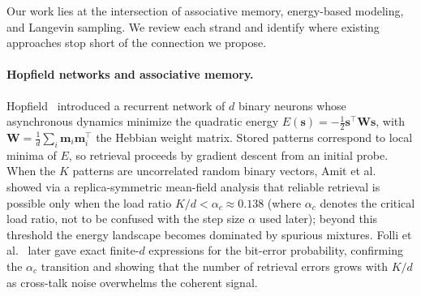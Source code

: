 
Our work lies at the intersection of associative memory, energy-based modeling, and Langevin sampling. We review each strand and identify where existing approaches stop short of the connection we propose.

\paragraph{Hopfield networks and associative memory.}
Hopfield~\cite{hopfieldNeuralNetworksPhysical1982} introduced a recurrent network of $d$ binary neurons whose asynchronous dynamics minimize the quadratic energy $E(\mathbf{s})=-\frac{1}{2}\mathbf{s}^{\top}\mathbf{W}\mathbf{s}$, with $\mathbf{W}=\frac{1}{d}\sum_{i}\mathbf{m}_i\mathbf{m}_i^{\top}$ the Hebbian weight matrix. Stored patterns correspond to local minima of $E$, so retrieval proceeds by gradient descent from an initial probe. When the $K$ patterns are uncorrelated random binary vectors, Amit et al.~\cite{amitStoringInfiniteNumbers1985} showed via a replica-symmetric mean-field analysis that reliable retrieval is possible only when the load ratio $K/d < \alpha_c \approx 0.138$ (where $\alpha_c$ denotes the critical load ratio, not to be confused with the step size $\alpha$ used later); beyond this threshold the energy landscape becomes dominated by spurious mixtures. Folli et al.~\cite{folliMaximumStorageCapacity2017} later gave exact finite-$d$ expressions for the bit-error probability, confirming the $\alpha_c$ transition and showing that the number of retrieval errors grows with $K/d$ as cross-talk noise overwhelms the coherent signal.

